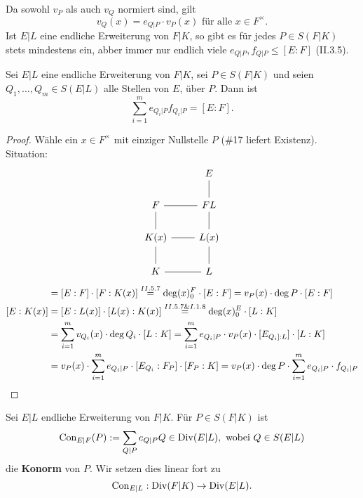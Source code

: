 \begin{bemerkungnr}
    Da sowohl $v_P$ als auch $v_Q$ normiert sind, gilt
    $$ v_Q(x) = e_{Q|P} \cdot v_P(x) \text{ für alle } x \in F^\times.$$
    Ist $E|L$ eine endliche Erweiterung von $F|K$, so gibt es für jedes $P \in S(F|K)$ stets mindestens ein, abber immer nur
    endlich viele $e_{Q|P}, f_{Q|P} \leq [E:F]$ (II.3.5).
\end{bemerkungnr}

\begin{theorem}
    Sei $E|L$ eine endliche Erweiterung von $F|K$, sei $P \in S(F|K)$ und seien $Q_1,\ldots,Q_m \in S(E|L)$ alle Stellen von
    $E$, über $P$. Dann ist
    $$ \sum\limits_{i=1}^m e_{Q_i|P}f_{Q_i|P} = [E:F]. $$
\end{theorem}
\begin{proof}
    Wähle ein $x \in F^\times$ mit einziger Nullstelle $P$ (\#17 liefert Existenz).
    Situation:
    $$\begin{tikzcd}
        & E\\
        F \rar[dash] & FL \uar[dash]\\
        K(x) \uar[dash] \rar[dash] & L(x) \uar[dash]\\
        K \uar[dash] \rar[dash] & L \uar[dash]  
    \end{tikzcd}$$
    \begin{align*}
        [E:K(x)] & = [E:F] \cdot [F:K(x)] \stackeq{II.5.7} \deg (x)_0^F \cdot [E:F] = v_P(x) \cdot \deg P \cdot [E:F]\\
        [E:K(x)] & = [E:L(x)] \cdot [L(x) : K(x)] \stackeq{II.5.7 \& I.1.8} \deg (x)_0^E \cdot [L:K] \\
        & = \sum\limits_{i=1}^m v_{Q_i}(x)\cdot \deg Q_i\cdot [L:K] = \sum\limits_{i=1}^m e_{Q_i|P} \cdot v_P(x) \cdot [E_{Q_i]:L}] \cdot [L:K]\\
        & = v_P(x) \cdot \sum\limits_{i=1}^m e_{Q_i|P} \cdot [E_{Q_i}:F_P] \cdot [F_P : K] = v_P(x) \cdot \deg P \cdot \sum\limits_{i=1}^m e_{Q_i|P} \cdot f_{Q_i|P}
    \end{align*}
\end{proof}

\begin{definition}
    Sei $E|L$ endliche Erweiterung von $F|K$. Für $P \in S(F|K)$ ist 
    \begin{align*}
        \operatorname{Con}_{E|F}(P) := \sum\limits_{Q|P} e_{Q|P} Q \in \operatorname{Div}(E|L), \text{ wobei } Q \in S(E|L)
    \end{align*}
    die \textbf{Konorm} von $P$. Wir setzen dies linear fort zu
    $$ \operatorname{Con}_{E|L} : \operatorname{Div}(F|K) \to \operatorname{Div}(E|L).$$
\end{definition}

